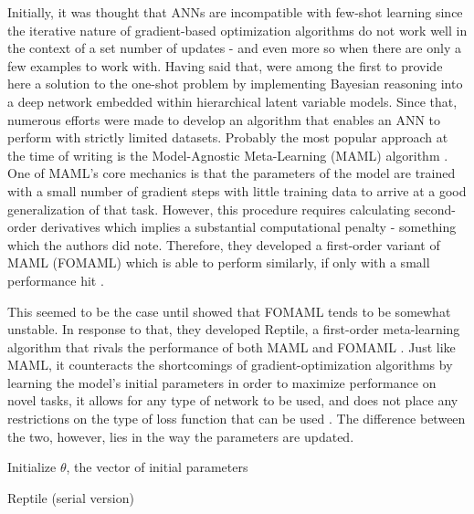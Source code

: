 \documentclass[a4paper]{book}
\begin{document}
Initially, it was thought that ANNs are incompatible with few-shot learning since the iterative nature of gradient-based optimization algorithms do not work well in the context of a set number of updates \parencite{ravi_optimization_2016} - and even more so when there are only a few examples to work with. Having said that, \textcite{rezende_one-shot_2016} were among the first to provide here a solution to the one-shot problem by implementing Bayesian reasoning into a deep network embedded within hierarchical latent variable models. Since that, numerous efforts were made to develop an algorithm that enables an ANN to perform with strictly limited datasets. Probably the most popular approach at the time of writing is the Model-Agnostic Meta-Learning (MAML) algorithm \parencite{finn_model-agnostic_2017}. One of MAML's core mechanics is that the parameters of the model are trained with a small number of gradient steps with little training data to arrive at a good generalization of that task. However, this procedure requires calculating second-order derivatives which implies a substantial computational penalty - something which the authors did note. Therefore, they developed a first-order variant of MAML (FOMAML) which is able to perform similarly, if only with a small performance hit \parencite{finn_model-agnostic_2017}.

This seemed to be the case until \textcite{nichol_first-order_2018} showed that FOMAML tends to be somewhat unstable. In response to that, they developed Reptile, a first-order meta-learning algorithm that rivals the performance of both MAML and FOMAML \parencite{nichol_first-order_2018}. Just like MAML, it counteracts the shortcomings of gradient-optimization algorithms by learning the model's initial parameters in order to maximize performance on novel tasks, it allows for any type of network to be used, and does not place any restrictions on the type of loss function that can be used \parencite{nichol_first-order_2018}. The difference between the two, however, lies in the way the parameters are updated. 

\IncMargin{1em}
\begin{algorithm}
Initialize $\theta$, the vector of initial parameters


\caption{Reptile (serial version)}
\label{alg:reptile}
\end{algorithm}
\DecMargin{1em}
\end{document}
